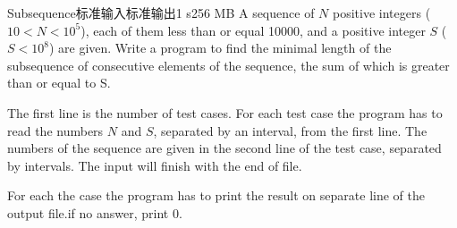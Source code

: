 \begin{problem}{Subsequence}{标准输入}{标准输出}{1 s}{256 MB}
A sequence of $N$ positive integers ($10 < N < 10^5$), each of them less than or equal 10000, and a positive integer $S$ ($S < 10^8$) are given. Write a program to find the minimal length of the subsequence of consecutive elements of the sequence, the sum of which is greater than or equal to S.

\InputFile
The first line is the number of test cases. For each test case the program has to read the numbers $N$ and $S$, separated by an interval, from the first line. The numbers of the sequence are given in the second line of the test case, separated by intervals. The input will finish with the end of file.

\OutputFile
For each the case the program has to print the result on separate line of the output file.if no answer, print $0$.

\Example

\begin{example}
\end{example}
\end{problem}
